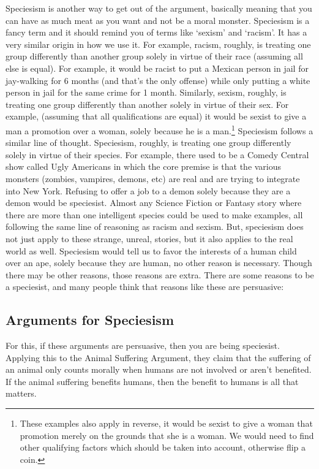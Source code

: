 Speciesism is another way to get out of the argument, basically meaning that you can have as much meat as you want and not be a moral monster. Speciesism is a fancy term and it should remind you of terms like ‘sexism’ and ‘racism’. It has a very similar origin in how we use it. For example, racism, roughly, is treating one group differently than another group solely in virtue of their race (assuming all else is equal). For example, it would be racist to put a Mexican person in jail for jay-walking for 6 months (and that's the only offense) while only putting a white person in jail for the same crime for 1 month. Similarly, sexism, roughly, is treating one group differently than another solely in virtue of their sex. For example, (assuming that all qualifications are equal) it would be sexist to give a man a promotion over a woman, solely because he is a man.\footnote{These examples also apply in reverse, it would be sexist to give a woman that promotion merely on the grounds that she is a woman. We would need to find other qualifying factors which should be taken into account, otherwise flip a coin.} Speciesism follows a similar line of thought. Speciesism, roughly, is treating one group differently solely in virtue of their species. For example, there used to be a Comedy Central show called Ugly Americans in which the core premise is that the various monsters (zombies, vampires, demons, etc) are real and are trying to integrate into New York. Refusing to offer a job to a demon solely because they are a demon would be speciesist. Almost any Science Fiction or Fantasy story where there are more than one intelligent species could be used to make examples, all following the same line of reasoning as racism and sexism. But, speciesism does not just apply to these strange, unreal, stories, but it also applies to the real world as well. Speciesism would tell us to favor the interests of a human child over an ape, solely because they are human, no other reason is necessary. Though there may be other reasons, those reasons are extra. There are some reasons to be a speciesist, and many people think that reasons like these are persuasive: 
\subsection{Arguments for Speciesism}

For this, if these arguments are persuasive, then you are being speciesist. Applying this to the Animal Suffering Argument, they claim that the suffering of an animal only counts morally when humans are not involved or aren't benefited. If the animal suffering benefits humans, then the benefit to humans is all that matters. 
